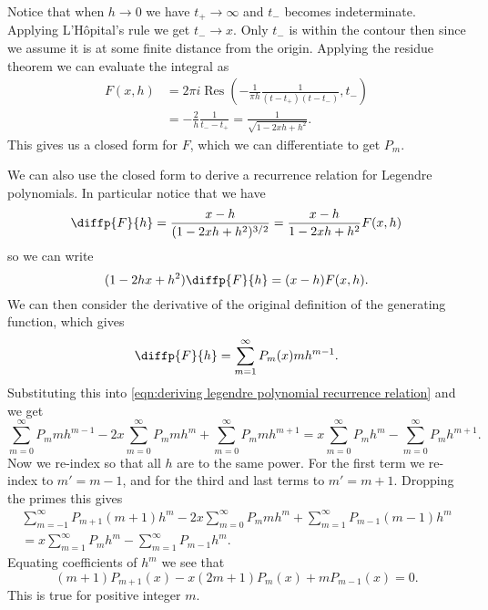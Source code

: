 \documentclass[fleqn]{NotesClass}
\DeclareMathOperator{\Res}{Res}
\begin{document}
    Notice that when \(h \to 0\) we have \(t_+ \to \infty\) and \(t_-\) becomes indeterminate.
    Applying L'H\^opital's rule we get \(t_- \to x\).
    Only \(t_-\) is within the contour then since we assume it is at some finite distance from the origin.
    Applying the residue theorem we can evaluate the integral as
    \begin{align}
        F(x, h) &= 2\pi i\Res\left( -\frac{1}{\pi h}\frac{1}{(t - t_+)(t - t_-)}, t_- \right)\\
        &= -\frac{2}{h} \frac{1}{t_{-} - t_{+}} = \frac{1}{\sqrt{1 - 2xh + h^2}}.\label{eqn:generating func closed form}
    \end{align}
    This gives us a closed form for \(F\), which we can differentiate to get \(P_m\).
    
    We can also use the closed form to derive a recurrence relation for Legendre polynomials.
    In particular notice that we have
    \begin{equation}
        \diffp{F}{h} = \frac{x - h}{(1 - 2xh + h^2)^{3/2}} = \frac{x - h}{1 - 2xh + h^2}F(x, h)
    \end{equation}
    so we can write
    \begin{equation}\label{eqn:deriving legendre polynomial recurrence relation}
        (1 - 2hx + h^2)\diffp{F}{h} = (x - h)F(x, h).
    \end{equation}
    We can then consider the derivative of the original definition of the generating function, which gives
    \begin{equation}
        \diffp{F}{h} = \sum_{m=1}^{\infty} P_m(x)mh^{m-1}.
    \end{equation}
    Substituting this into \cref{eqn:deriving legendre polynomial recurrence relation} and we get
    \begin{equation}
        \sum_{m=0}^{\infty} P_m m h^{m - 1} - 2x \sum_{m=0}^{\infty} P_mmh^m + \sum_{m=0}^{\infty} P_mmh^{m + 1} = x\sum_{m=0}^{\infty} P_mh^m - \sum_{m=0}^{\infty} P_mh^{m+1}.
    \end{equation}
    Now we re-index so that all \(h\) are to the same power.
    For the first term we re-index to \(m' = m - 1\), and for the third and last terms to \(m' = m + 1\).
    Dropping the primes this gives
    \begin{multline}
        \sum_{m=-1}^{\infty} P_{m+1}(m + 1) h^m - 2x \sum_{m=0}^{\infty} P_mmh^m + \sum_{m=1}^{\infty} P_{m-1} (m - 1)h^m\\
        = x\sum_{m=1}^{\infty} P_mh^m - \sum_{m=1}^{\infty} P_{m-1}h^m.
    \end{multline}
    Equating coefficients of \(h^m\) we see that
    \begin{equation}
        (m + 1)P_{m+1}(x) - x(2m + 1)P_m(x) + mP_{m-1}(x) = 0.
    \end{equation}
    This is true for positive integer \(m\).
    
\end{document}
